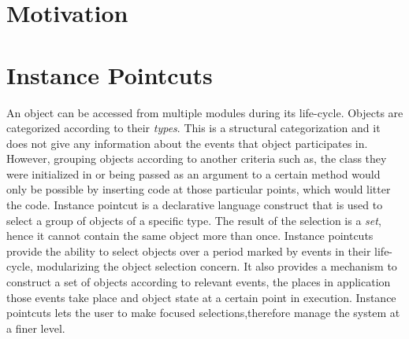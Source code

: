 \documentclass{llncs}
\begin{document}
%
%

\section{Motivation}

\section{Instance Pointcuts}

An object can be accessed from multiple modules during its life-cycle. Objects are categorized according to their \emph{types}. This is a structural categorization and it does not give any information about the events that object participates in. However, grouping objects according to another criteria such as, the class they were initialized in or being passed as an argument to a certain method would only be possible by inserting code at those particular points, which would litter the code.  
Instance pointcut is a declarative language construct that is used to select a group of objects of a specific type. The result of the selection is a \emph{set}, hence it cannot contain the same object more than once. Instance pointcuts provide the ability to select objects over a period marked by events in their life-cycle, modularizing the object selection concern. It also provides a mechanism to construct a set of objects according to relevant events, the places in application those events take place and object state at a certain point in execution. Instance pointcuts lets the user to make focused selections,therefore manage the system at a finer level.
\end{document}
